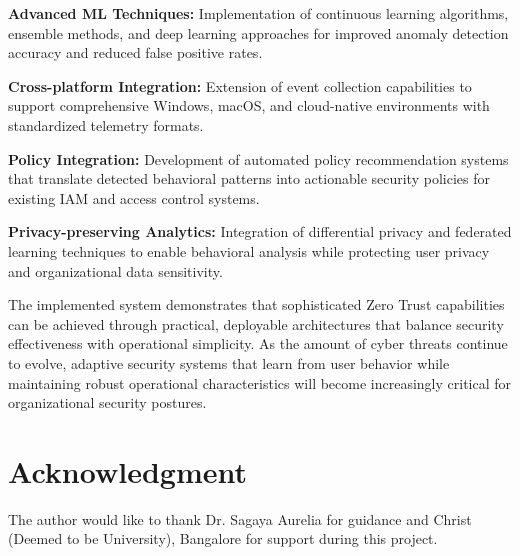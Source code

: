 \documentclass[conference]{IEEEtran}
\begin{document}
\textbf{Advanced ML Techniques:} Implementation of continuous learning algorithms, ensemble methods, and deep learning approaches for improved anomaly detection accuracy and reduced false positive rates.

\textbf{Cross-platform Integration:} Extension of event collection capabilities to support comprehensive Windows, macOS, and cloud-native environments with standardized telemetry formats.

\textbf{Policy Integration:} Development of automated policy recommendation systems that translate detected behavioral patterns into actionable security policies for existing IAM and access control systems.

\textbf{Privacy-preserving Analytics:} Integration of differential privacy and federated learning techniques to enable behavioral analysis while protecting user privacy and organizational data sensitivity.

The implemented system demonstrates that sophisticated Zero Trust capabilities can be achieved through practical, deployable architectures that balance security effectiveness with operational simplicity. As the amount of cyber threats continue to evolve, adaptive security systems that learn from user behavior while maintaining robust operational characteristics will become
increasingly critical for organizational security postures.

\section*{Acknowledgment}
The author would like to thank Dr. Sagaya Aurelia for guidance and Christ (Deemed to be University), Bangalore for support during this project.
\end{document}
